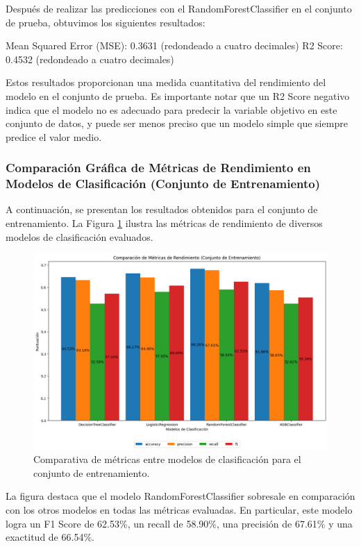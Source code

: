 Después de realizar las predicciones con el RandomForestClassifier en el conjunto de prueba, obtuvimos los siguientes resultados:

Mean Squared Error (MSE): 0.3631 (redondeado a cuatro decimales)
R2 Score: 0.4532 (redondeado a cuatro decimales)

Estos resultados proporcionan una medida cuantitativa del rendimiento del modelo en el conjunto de prueba. Es importante notar que un R2 Score negativo indica que el modelo no es adecuado para predecir la variable objetivo en este conjunto de datos, y puede ser menos preciso que un modelo simple que siempre predice el valor medio.


\subsubsection{Comparación Gráfica de Métricas de Rendimiento en Modelos de Clasificación (Conjunto de Entrenamiento)}

A continuación, se presentan los resultados obtenidos para el conjunto de entrenamiento. La Figura \ref{fig:metricas_clasificacion} ilustra las métricas de rendimiento de diversos modelos de clasificación evaluados.

\begin{figure}[H]
    \centering
    \includegraphics[width=1\textwidth]{img/compara_algoritmos/metricasEntreModelosClasificacion.png}
    \caption{Comparativa de métricas entre modelos de clasificación para el conjunto de entrenamiento.}
    \label{fig:metricas_clasificacion}
\end{figure}

La figura destaca que el modelo RandomForestClassifier sobresale en comparación con los otros modelos en todas las métricas evaluadas. En particular, este modelo logra un F1 Score de 62.53\%, un recall de 58.90\%, una precisión de 67.61\% y una exactitud de 66.54\%.

